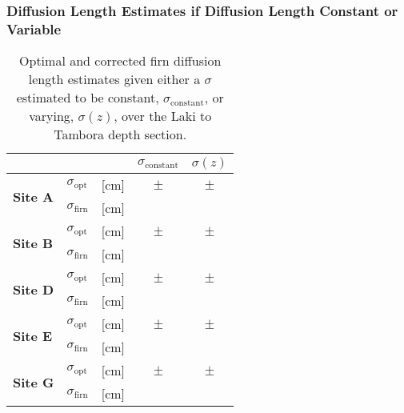 \documentclass[../../CompleteThesis2/Complete_2ndDraft]{subfiles}
\begin{document}
\subsubsection[$\sigma$ Constant or Variable]{Diffusion Length Estimates if Diffusion Length Constant or Variable}
\label{Subsubsec:Results_DiffLenEst_AlphabetCores_SigConstVar}

\begin{table}[ht]
	\centering
	\begin{tabular}{l l l | c | c}
		& & & $\sigma_{\text{constant}}$ & $\sigma(z)$\\
		\hline
		\hline 
		\multirow{2}{*}{\textbf{Site A}} & $\sigma_{\text{opt}}$ & [cm] & $ \pm$ & $ \pm $\\
		& $\sigma_{\text{firn}}$ & [cm] & & \\
		\hline
		
		\multirow{2}{*}{\textbf{Site B}} & $\sigma_{\text{opt}}$ & [cm] & $ \pm $ & $ \pm $ \\
		& $\sigma_{\text{firn}}$ & [cm] & & \\
		\hline
		
		\multirow{2}{*}{\textbf{Site D}} & $\sigma_{\text{opt}}$ & [cm] & $ \pm $ & $ \pm $ \\
		& $\sigma_{\text{firn}}$ & [cm] & & \\
		\hline
		
		\multirow{2}{*}{\textbf{Site E}} & $\sigma_{\text{opt}}$ & [cm] & $ \pm $ & $ \pm $ \\
		& $\sigma_{\text{firn}}$ & [cm] & & \\
		\hline
		
		\multirow{2}{*}{\textbf{Site G}} & $\sigma_{\text{opt}}$ & [cm] & $ \pm $ & $ \pm $ \\
		& $\sigma_{\text{firn}}$ & [cm] & & \\
		
		\hline
	\end{tabular}
	\caption[$\sigma$ Given Constant or Varying]{\small Optimal and corrected firn diffusion length estimates given either a $\sigma$ estimated to be constant, $\sigma_{\text{constant}}$, or varying, $\sigma(z)$, over the Laki to Tambora depth section. }
\end{table}
\end{document}
